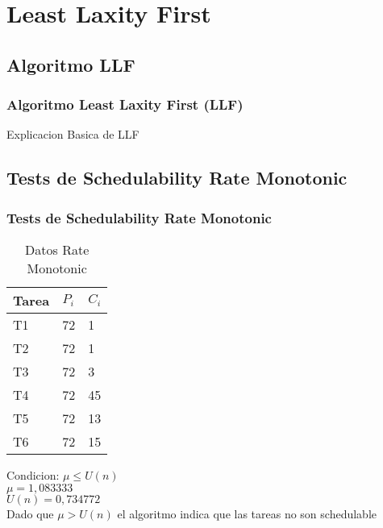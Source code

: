 \documentclass[xcolor=table]{beamer}
\begin{document}

\section{Least Laxity First}

\subsection{Algoritmo LLF}

\begin{frame} 
\frametitle{Algoritmo Least Laxity First (LLF)} 
Explicacion Basica de LLF \\
\end{frame}

\subsection{Tests de Schedulability  Rate Monotonic } 

\begin{frame} 
\frametitle{Tests de Schedulability  Rate Monotonic } 
\begin{table} 
\centering 
\begin{tabular}{|l|l|l|} 
\hline 
\cellcolor{lightgray}Tarea & \cellcolor{lightgray}$P_i$ & \cellcolor{lightgray}$C_i$ \\ \hline 
T1   & 72  &  1\\ \hline 
T2   & 72  &  1\\ \hline 
T3   & 72  &  3\\ \hline 
T4   & 72  &  45\\ \hline 
T5   & 72  &  13\\ \hline 
T6   & 72  &  15\\ \hline 
\end{tabular} 
\caption{Datos  Rate Monotonic } 
\end{table} 
Condicion: $\mu \leq U(n)$ \\ 
$\mu =  1,083333 $ \\ 
$U(n) =  0,734772 $ \\ 
Dado que $\mu>U(n)$ el algoritmo indica que las tareas no son schedulable \\ 
\end{frame} 

\end{document}
